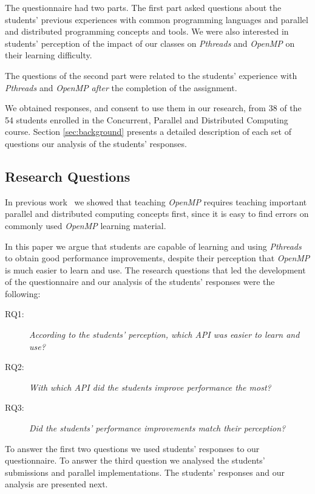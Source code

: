 The questionnaire had two parts. The first part asked questions
about the students' previous experiences with common programming languages and
parallel and distributed programming concepts and tools. We were also
interested in students' perception of the impact of our classes on
\textit{Pthreads} and \textit{OpenMP} on their learning difficulty.

The questions of the second part were related to the students'
experience with \textit{Pthreads} and \textit{OpenMP} \textit{after}
the completion of the assignment.

We obtained responses, and consent to use them in our research, from 38 of the
54 students enrolled in the Concurrent, Parallel and Distributed Computing
course. Section \ref{sec:background} presents a detailed description of
each set of questions our analysis of the students' responses.

\subsection{Research Questions}

In previous work~\cite{goncalves:OpenMPNotEasy} we showed that
teaching \textit{OpenMP} requires teaching important parallel
and distributed computing concepts first, since it is easy
to find errors on commonly used \textit{OpenMP} learning material.

In this paper we argue that students are capable of learning and using
\textit{Pthreads} to obtain good performance improvements, despite their
perception that \textit{OpenMP} is much easier to learn and use.
The research questions that led the development of the questionnaire
and our analysis of the students' responses were the following:

\begin{description}
    \item[RQ1:] \textit{According to the students' perception, which API was
        easier to learn and use?}
    \item[RQ2:] \textit{With which API did the students improve performance the
        most?}
    \item[RQ3:] \textit{Did the students' performance improvements match their
        perception?}
\end{description}

To answer the first two questions we used students' responses to
our questionnaire. To answer the third question we analysed the
students' submissions and parallel implementations. The
students' responses and our analysis are presented next.
